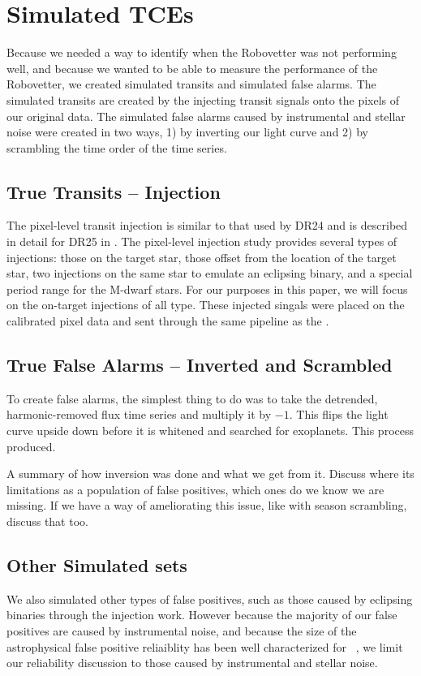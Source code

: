 \section{Simulated TCEs}

Because we needed a way to identify when the Robovetter was not performing well, and because we wanted to be able to measure the performance of the Robovetter, we created simulated transits and simulated false alarms. The simulated transits are created by the injecting transit signals onto the pixels of our original data.  The simulated false alarms caused by instrumental and stellar noise were created in two ways, 1) by inverting our light curve and 2) by scrambling the time order of the time series.  


\subsection{True Transits -- Injection}
\label{injectsec}
The pixel-level transit injection is similar to that used by DR24 \citep{Christiansen2016} and is described in detail for DR25 in \citep{Christiansen2017}. The pixel-level injection study provides several types of injections: those on the target star, those offset from the location of the target star, two injections on the same star to emulate an eclipsing binary, and a special period range for the M-dwarf stars.  For our purposes in this paper, we will focus on the on-target injections of all type.  These injected singals were placed on the calibrated pixel data and sent through the same \Kepler{} pipeline as the \obstces.


\subsection{True False Alarms -- Inverted and Scrambled} 

To create false alarms, the simplest thing to do was to take the detrended, harmonic-removed flux time series and multiply it by $-1$.  This flips the light curve upside down before it is whitened and searched for exoplanets. This process produced.



A summary of how inversion was done and what we get from it. Discuss where its limitations as a population of false positives, which ones do we know we are missing. If we have a way of ameliorating this issue, like with season scrambling, discuss that too.


\subsection{Other Simulated sets}
We also simulated other types of false positives, such as those caused by eclipsing binaries through the injection work. However because the majority of our false positives are caused by instrumental noise, and because the size of the astrophysical false positive reliaiblity has been well characterized for \Kepler\ \citep[e.g.][]{Morton2016}, we limit our reliability discussion to those caused by instrumental and stellar noise.

